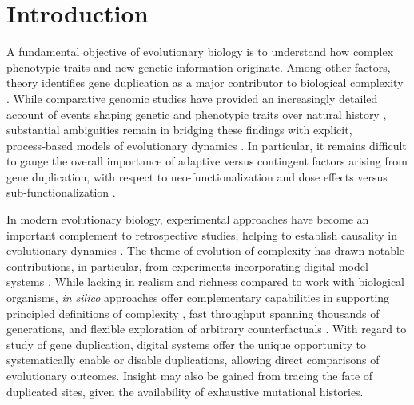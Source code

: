 \section{Introduction} \label{sec:introduction}

A fundamental objective of evolutionary biology is to understand how complex phenotypic traits and new genetic information originate.
Among other factors, theory identifies gene duplication as a major contributor to biological complexity \citep{Zhang2003,Otto2000,Wagner2008,Wagner2007,Crow:2006role,Magadum:2013wu,Metz:chromosomeDuplication1947,Hu:2010ea}.
While comparative genomic studies have provided an increasingly detailed account of events shaping genetic and phenotypic traits over natural history \citep{Zhang2014,teichmann_structural_1998,Teichmann:2004cz}, substantial ambiguities remain in bridging these findings with explicit, process‑based models of evolutionary dynamics \citep{Welch2016}.
In particular, it remains difficult to  gauge the overall importance of adaptive versus contingent factors arising from gene duplication, with respect to neo‑functionalization and dose effects versus sub‑functionalization \citep{Innan2010,Zhang:2003fw}.

In modern evolutionary biology, experimental approaches have become an important complement to retrospective studies, helping to establish causality in evolutionary dynamics \citep{Kawecki2012}.
The theme of evolution of complexity has drawn notable contributions, in particular, from experiments incorporating digital model systems \citep{Fortuna2022}.
While lacking in realism and richness compared to work with biological organisms, \textit{in silico} approaches offer complementary capabilities in supporting principled definitions of complexity \citep{Adami2002}, fast throughput spanning thousands of generations, and flexible exploration of arbitrary counterfactuals \citep{langton1989artificial}.
With regard to study of gene duplication, digital systems offer the unique opportunity to systematically enable or disable duplications, allowing direct comparisons of evolutionary outcomes.
Insight may also be gained from tracing the fate of duplicated sites, given the availability of exhaustive mutational histories.

